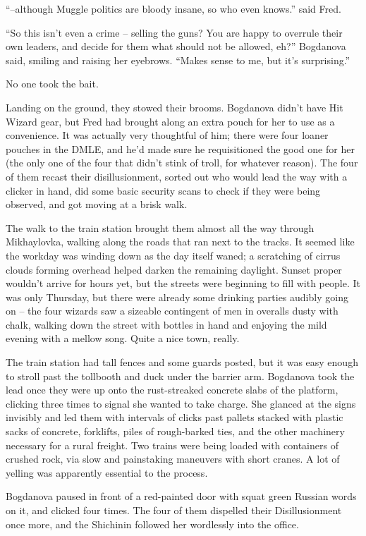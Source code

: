 ``--although Muggle politics are bloody insane, so who even knows.''
said Fred.

``So this isn't even a crime -- selling the guns? You are happy to
overrule their own leaders, and decide for them what should not be
allowed, eh?'' Bogdanova said, smiling and raising her eyebrows. ``Makes
sense to me, but it's surprising.''

No one took the bait.

Landing on the ground, they stowed their brooms. Bogdanova didn't have
Hit Wizard gear, but Fred had brought along an extra pouch for her to
use as a convenience. It was actually very thoughtful of him; there were
four loaner pouches in the DMLE, and he'd made sure he requisitioned the
good one for her (the only one of the four that didn't stink of troll,
for whatever reason). The four of them recast their disillusionment,
sorted out who would lead the way with a clicker in hand, did some basic
security scans to check if they were being observed, and got moving at a
brisk walk.

The walk to the train station brought them almost all the way through
Mikhaylovka, walking along the roads that ran next to the tracks. It
seemed like the workday was winding down as the day itself waned; a
scratching of cirrus clouds forming overhead helped darken the remaining
daylight. Sunset proper wouldn't arrive for hours yet, but the streets
were beginning to fill with people. It was only Thursday, but there were
already some drinking parties audibly going on -- the four wizards saw a
sizeable contingent of men in overalls dusty with chalk, walking down
the street with bottles in hand and enjoying the mild evening with a
mellow song. Quite a nice town, really.

The train station had tall fences and some guards posted, but it was
easy enough to stroll past the tollbooth and duck under the barrier arm.
Bogdanova took the lead once they were up onto the rust-streaked
concrete slabs of the platform, clicking three times to signal she
wanted to take charge. She glanced at the signs invisibly and led them
with intervals of clicks past pallets stacked with plastic sacks of
concrete, forklifts, piles of rough-barked ties, and the other machinery
necessary for a rural freight. Two trains were being loaded with
containers of crushed rock, via slow and painstaking maneuvers with
short cranes. A lot of yelling was apparently essential to the process.

Bogdanova paused in front of a red-painted door with squat green Russian
words on it, and clicked four times. The four of them dispelled their
Disillusionment once more, and the Shichinin followed her wordlessly
into the office.

